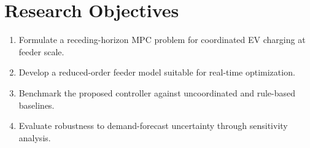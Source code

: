 \section{Research Objectives}
\begin{enumerate}[leftmargin=1.4cm]
  \item Formulate a receding-horizon MPC problem for coordinated EV charging at feeder scale.
  \item Develop a reduced-order feeder model suitable for real-time optimization.
  \item Benchmark the proposed controller against uncoordinated and rule-based baselines.
  \item Evaluate robustness to demand-forecast uncertainty through sensitivity analysis.
\end{enumerate}
